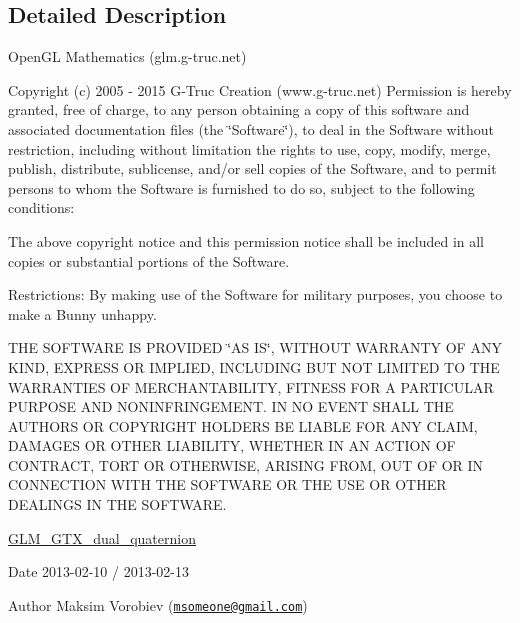 \subsection{Detailed Description}
Open\-G\-L Mathematics (glm.\-g-\/truc.\-net)

Copyright (c) 2005 -\/ 2015 G-\/\-Truc Creation (www.\-g-\/truc.\-net) Permission is hereby granted, free of charge, to any person obtaining a copy of this software and associated documentation files (the \char`\"{}\-Software\char`\"{}), to deal in the Software without restriction, including without limitation the rights to use, copy, modify, merge, publish, distribute, sublicense, and/or sell copies of the Software, and to permit persons to whom the Software is furnished to do so, subject to the following conditions\-:

The above copyright notice and this permission notice shall be included in all copies or substantial portions of the Software.

Restrictions\-: By making use of the Software for military purposes, you choose to make a Bunny unhappy.

T\-H\-E S\-O\-F\-T\-W\-A\-R\-E I\-S P\-R\-O\-V\-I\-D\-E\-D \char`\"{}\-A\-S I\-S\char`\"{}, W\-I\-T\-H\-O\-U\-T W\-A\-R\-R\-A\-N\-T\-Y O\-F A\-N\-Y K\-I\-N\-D, E\-X\-P\-R\-E\-S\-S O\-R I\-M\-P\-L\-I\-E\-D, I\-N\-C\-L\-U\-D\-I\-N\-G B\-U\-T N\-O\-T L\-I\-M\-I\-T\-E\-D T\-O T\-H\-E W\-A\-R\-R\-A\-N\-T\-I\-E\-S O\-F M\-E\-R\-C\-H\-A\-N\-T\-A\-B\-I\-L\-I\-T\-Y, F\-I\-T\-N\-E\-S\-S F\-O\-R A P\-A\-R\-T\-I\-C\-U\-L\-A\-R P\-U\-R\-P\-O\-S\-E A\-N\-D N\-O\-N\-I\-N\-F\-R\-I\-N\-G\-E\-M\-E\-N\-T. I\-N N\-O E\-V\-E\-N\-T S\-H\-A\-L\-L T\-H\-E A\-U\-T\-H\-O\-R\-S O\-R C\-O\-P\-Y\-R\-I\-G\-H\-T H\-O\-L\-D\-E\-R\-S B\-E L\-I\-A\-B\-L\-E F\-O\-R A\-N\-Y C\-L\-A\-I\-M, D\-A\-M\-A\-G\-E\-S O\-R O\-T\-H\-E\-R L\-I\-A\-B\-I\-L\-I\-T\-Y, W\-H\-E\-T\-H\-E\-R I\-N A\-N A\-C\-T\-I\-O\-N O\-F C\-O\-N\-T\-R\-A\-C\-T, T\-O\-R\-T O\-R O\-T\-H\-E\-R\-W\-I\-S\-E, A\-R\-I\-S\-I\-N\-G F\-R\-O\-M, O\-U\-T O\-F O\-R I\-N C\-O\-N\-N\-E\-C\-T\-I\-O\-N W\-I\-T\-H T\-H\-E S\-O\-F\-T\-W\-A\-R\-E O\-R T\-H\-E U\-S\-E O\-R O\-T\-H\-E\-R D\-E\-A\-L\-I\-N\-G\-S I\-N T\-H\-E S\-O\-F\-T\-W\-A\-R\-E.

\hyperlink{group__gtx__dual__quaternion}{G\-L\-M\-\_\-\-G\-T\-X\-\_\-dual\-\_\-quaternion}

\begin{DoxyDate}{Date}
2013-\/02-\/10 / 2013-\/02-\/13 
\end{DoxyDate}
\begin{DoxyAuthor}{Author}
Maksim Vorobiev (\href{mailto:msomeone@gmail.com}{\tt msomeone@gmail.\-com}) 
\end{DoxyAuthor}
